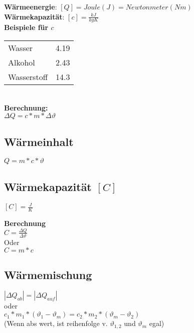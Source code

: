 \documentclass[a4paper]{article}
\begin{document}
\begin{multicols}{3}
  \textbf{Wärmeenergie}: $[Q] = Joule (J) = Newtonmeter (Nm)$\\
  \textbf{Wärmekapazität}: $ [c] = \frac{kJ}{kg K}$\\
  
  \textbf{Beispiele für $ c $}\\ 
  \begin{tabular}{ll}
  	Wasser & 4.19 \\
  	Alkohol & 2.43 \\
  	Wasserstoff & 14.3
  \end{tabular}\\
  
  \textbf{Berechnung:}\\
  $ \Delta Q = c * m * \Delta \vartheta $
  
  \subsection{Wärmeinhalt}
  $ Q = m * c * \vartheta $
  \subsection{Wärmekapazität $[C]$}
  
  $ [C] = \frac{J}{K} $
  
  \textbf{Berechnung}\\
  $ C = \frac{\Delta Q}{\Delta \vartheta} $\\
  
  Oder \\
  
  $ C = m * c $
  
  \subsection{Wärmemischung}
  
  $ |\Delta Q_{ab}| = | \Delta Q_{auf} | $\\
  oder\\
  $c_1 * m_1  * (\vartheta_1 - \vartheta_m) = c_2 * m_2 * (\vartheta_m - \vartheta_2) $\\
  (Wenn abs wert, ist reihenfolge v. $ \vartheta_{1,2}$ und $ \vartheta_m $ egal)
\end{multicols}

\end{document}
